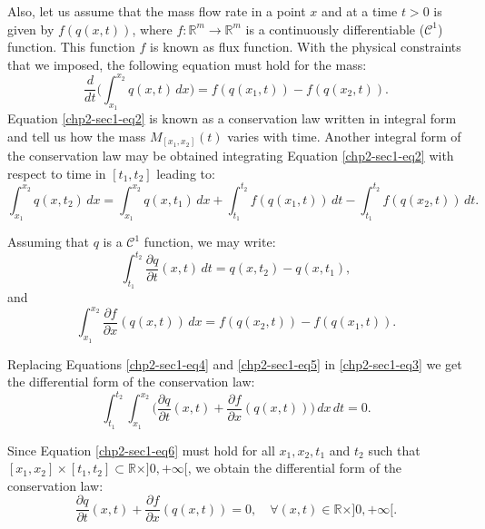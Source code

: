 Also, let us assume that the mass flow rate in a point $x$ and at a time 
$t > 0$ is given by ${f}({q}(x,t))$, where ${f}:\mathbb{R}^m \to \mathbb{R}^m$ is 
a continuously differentiable ($\mathcal{C}^1$) function. This function ${f}$ is known as flux function.
With the physical constraints that we imposed, the following equation must hold for the mass:
\begin{equation}
	\label{chp2-sec1-eq2}
	\frac{d}{dt} \bigg( \int_{x_1}^{x_2} {q}(x,t) \,dx \bigg) = 
	{f}({q}(x_1,t)) - {f}({q}(x_2,t)) .
\end{equation}
Equation \eqref{chp2-sec1-eq2} is known as a conservation law written in integral form and tell us how the mass 
${M}_{[x_1, x_2]}(t)$ varies with time. Another integral form of the conservation law may be obtained integrating
Equation \eqref{chp2-sec1-eq2} with respect to time in $[t_1, t_2]$ leading to: 
\begin{equation}
	\label{chp2-sec1-eq3}
	\int_{x_1}^{x_2} {q}(x, t_2) \,dx = 
	\int_{x_1}^{x_2} {q}(x, t_1) \,dx + 
	\int_{t_1}^{t_2} {f}({q}(x_1, t)) \,dt -
	\int_{t_1}^{t_2}{f}({q}(x_2, t)) \,dt .
\end{equation}

Assuming that ${q}$ is a $\mathcal{C}^1$ function, we may write:
\begin{equation}
	\label{chp2-sec1-eq4}
	\int_{t_1}^{t_2} 
	\frac{\partial q}{\partial t}(x,t) \,dt
	= {q}(x, t_2) - {q}(x, t_1) ,
\end{equation}
and
\begin{equation}
	\label{chp2-sec1-eq5}
	\int_{x_1}^{x_2} \frac{\partial f}{\partial x}({q}(x,t)) \,dx 
	= {f}({q}(x_2, t)) -
	{f}( {q}(x_1, t)) .
\end{equation}

Replacing Equations \eqref{chp2-sec1-eq4} and \eqref{chp2-sec1-eq5}
in \eqref{chp2-sec1-eq3} we get the differential form of the conservation law:
\begin{equation}
	\label{chp2-sec1-eq6}
	\int_{t_1}^{t_2} \int_{x_1}^{x_2} 
	\bigg( \frac{\partial q}{\partial t}(x, t) 
	+ \frac{\partial f}{\partial x}({q}(x, t)) \bigg) 
	\,dx \,dt  = 0.
\end{equation}

Since Equation \eqref{chp2-sec1-eq6} must hold for all $x_1, x_2, t_1$ and $t_2$ such that
$[x_1, x_2] \times [t_1, t_2] \subset \mathbb{R}\times ]0, +\infty[$, we obtain the differential form of the conservation law:
\begin{equation}
	\label{chp2-sec1-eq7}
	\frac{\partial q}{\partial t}(x, t) +
	\frac{\partial f}{\partial x} ({q}(x, t))
	= 0, \quad \forall (x,t) \in \mathbb{R}\times ]0, +\infty[. 
\end{equation}

